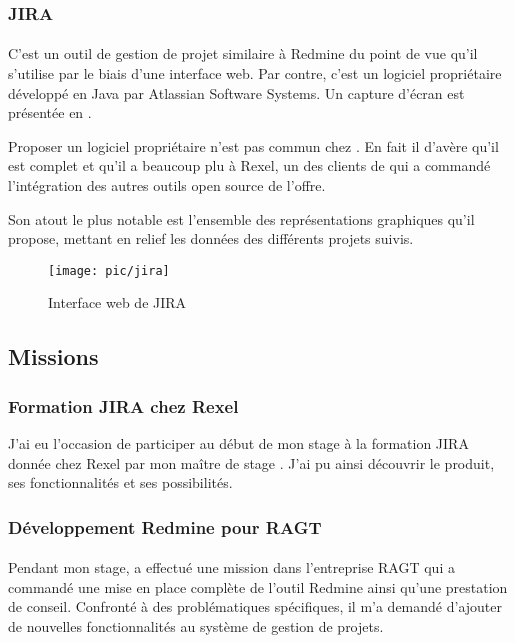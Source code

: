 \subsubsection{JIRA}

\paragraph{}
C'est un outil de gestion de projet similaire à Redmine du point de vue qu'il s'utilise par le biais d'une interface web.
Par contre, c'est un logiciel propriétaire développé en Java par Atlassian Software Systems.
Un capture d'écran est présentée en .

Proposer un logiciel propriétaire n'est pas commun chez \asmile.
En fait il d'avère qu'il est complet et qu'il a beaucoup plu à Rexel, un des clients de \asmile{} qui a commandé l'intégration des autres outils open source de l'offre.

Son atout le plus notable est l'ensemble des représentations graphiques qu'il propose, mettant en relief les données des différents projets suivis.

\begin{figure}
	\centering
	\texttt{[image: pic/jira]}
	\caption{Interface web de JIRA}
	\label{figure:pic:jira}
\end{figure}



\subsection{Missions}

\subsubsection{Formation JIRA chez Rexel}

J'ai eu l'occasion de participer au début de mon stage à la formation JIRA donnée chez Rexel par mon maître de stage \agulet.
J'ai pu ainsi découvrir le produit, ses fonctionnalités et ses possibilités.



\subsubsection{Développement Redmine pour RAGT}

\paragraph{}
Pendant mon stage, \agulet{} a effectué une mission dans l'entreprise RAGT qui a commandé une mise en place complète de l'outil Redmine ainsi qu'une prestation de conseil.
Confronté à des problématiques spécifiques, il m'a demandé d'ajouter de nouvelles fonctionnalités au système de gestion de projets.

